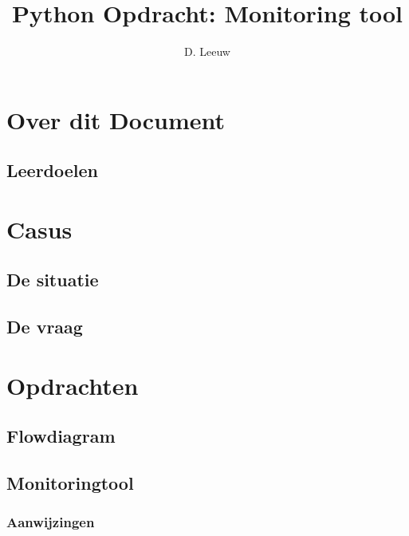 \documentclass[a4paper,12pt,twoside,openright,titlepage]{article}
\author{D. Leeuw}
\title{Python Opdracht: Monitoring tool}
\date{\today\\
0.5.0\\
\vfill
\raggedright
\copyright\ 2025-2026 Dennis Leeuw\\
}
\begin{document}

\maketitle


\section{Over dit Document}
\subsection{Leerdoelen}



\section{Casus}
\subsection{De situatie}

\subsection{De vraag}


\section{Opdrachten}
\subsection{Flowdiagram}

\subsection{Monitoringtool}

\subsubsection{Aanwijzingen}


\printindex
\end{document}
